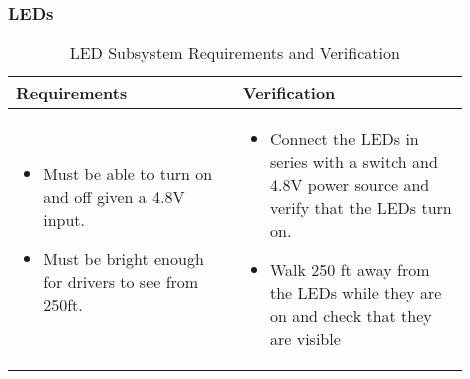 \subsubsection{LEDs}
\begin{table}[h]
    \centering
    \caption{LED Subsystem Requirements and Verification}
    \begin{tabular}{p{0.45\linewidth}p{0.45\linewidth}}
    \toprule
    \textbf{Requirements} & \textbf{Verification} \\
    \midrule
    \begin{itemize}[leftmargin=*, nosep, after=\strut]
        \item Must be able to turn on and off given a 4.8V input.
        \item Must be bright enough for drivers to see from 250ft.
        
    \end{itemize} &
    \begin{itemize}[leftmargin=*, nosep, after=\strut]
        \item Connect the LEDs in series with a switch and 4.8V power source and verify that the LEDs turn on.
        \item Walk 250 ft away from the LEDs while they are on and check that they are visible
    
    \end{itemize} \\
    \bottomrule
    \end{tabular}
    \end{table}
    \newpage
